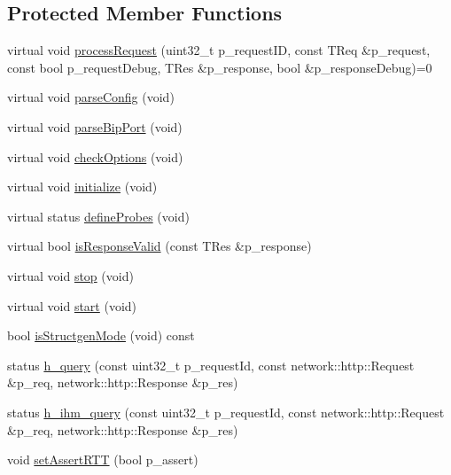 \subsection*{Protected Member Functions}
\begin{DoxyCompactItemize}
\item 
virtual void \hyperlink{classxtd_1_1servers_1_1app_1_1Server_ad3c9fd71ba0399f18c27b15cb1d28e65}{process\-Request} (uint32\-\_\-t p\-\_\-request\-I\-D, const T\-Req \&p\-\_\-request, const bool p\-\_\-request\-Debug, T\-Res \&p\-\_\-response, bool \&p\-\_\-response\-Debug)=0
\item 
virtual void \hyperlink{classxtd_1_1servers_1_1app_1_1Server_a04ac2d5b3a0a229a3b54ef33b9b7056d}{parse\-Config} (void)
\item 
virtual void \hyperlink{classxtd_1_1servers_1_1app_1_1Server_aeb01b34fd4e8564b8cd18c2041dc253f}{parse\-Bip\-Port} (void)
\item 
virtual void \hyperlink{classxtd_1_1servers_1_1app_1_1Server_a6f5fff5c5058dc43aea7b27a046c985b}{check\-Options} (void)
\item 
virtual void \hyperlink{classxtd_1_1servers_1_1app_1_1Server_aabde8b6a3810b09f029821dddafe3b8c}{initialize} (void)
\item 
virtual status \hyperlink{classxtd_1_1servers_1_1app_1_1Server_afbe76a86e66e635907229d37b1267037}{define\-Probes} (void)
\item 
virtual bool \hyperlink{classxtd_1_1servers_1_1app_1_1Server_a00c2f9aaa3c130299a4c77f86bf37d38}{is\-Response\-Valid} (const T\-Res \&p\-\_\-response)
\item 
virtual void \hyperlink{classxtd_1_1servers_1_1app_1_1Server_a37fe0eca660f81a9edde0c1ce6938f39}{stop} (void)
\item 
virtual void \hyperlink{classxtd_1_1servers_1_1app_1_1Server_a8e21bf6e7993a2e04fd70d0ce88ca487}{start} (void)
\item 
bool \hyperlink{classxtd_1_1servers_1_1app_1_1Server_ad1161e88fb26561ffbef7254fb263d15}{is\-Structgen\-Mode} (void) const 
\item 
status \hyperlink{classxtd_1_1servers_1_1app_1_1Server_ae4ad855e88777c7e5afe9d673037ca6b}{h\-\_\-query} (const uint32\-\_\-t p\-\_\-request\-Id, const network\-::http\-::\-Request \&p\-\_\-req, network\-::http\-::\-Response \&p\-\_\-res)
\item 
status \hyperlink{classxtd_1_1servers_1_1app_1_1Server_a10fc93bccaf973467b0df7de87b4ae79}{h\-\_\-ihm\-\_\-query} (const uint32\-\_\-t p\-\_\-request\-Id, const network\-::http\-::\-Request \&p\-\_\-req, network\-::http\-::\-Response \&p\-\_\-res)
\item 
void \hyperlink{classxtd_1_1servers_1_1app_1_1Server_ab6700b87291ddfa7de81f11ec4f866e6}{set\-Assert\-R\-T\-T} (bool p\-\_\-assert)
\end{DoxyCompactItemize}
